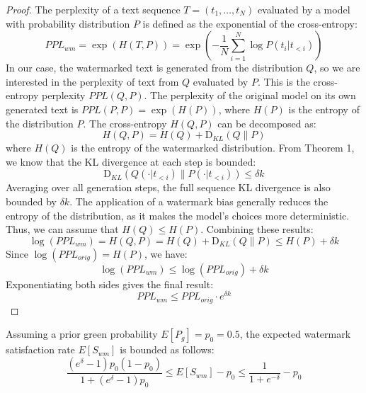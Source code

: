 \begin{proof}
The perplexity of a text sequence $T=(t_1, \dots, t_N)$ evaluated by a model with probability distribution $P$ is defined as the exponential of the cross-entropy:
$$PPL_{wm} = \exp\left(H(T, P)\right) = \exp\left(-\frac{1}{N}\sum_{i=1}^N \log P(t_i|t_{<i})\right)$$
In our case, the watermarked text is generated from the distribution $Q$, so we are interested in the perplexity of text from $Q$ evaluated by $P$. This is the cross-entropy perplexity $PPL(Q,P)$. The perplexity of the original model on its own generated text is $PPL(P,P) = \exp(H(P))$, where $H(P)$ is the entropy of the distribution $P$.
The cross-entropy $H(Q,P)$ can be decomposed as:
$$H(Q,P) = H(Q) + \mathrm{D}_{KL}(Q \parallel P)$$
where $H(Q)$ is the entropy of the watermarked distribution.
From Theorem 1, we know that the KL divergence at each step is bounded:
$$\mathrm{D}_{KL}(Q(\cdot|t_{<i}) \parallel P(\cdot|t_{<i})) \le \delta k$$
Averaging over all generation steps, the full sequence KL divergence is also bounded by $\delta k$.
The application of a watermark bias generally reduces the entropy of the distribution, as it makes the model's choices more deterministic. Thus, we can assume that $H(Q) \le H(P)$.
Combining these results:
$$\log(PPL_{wm}) = H(Q,P) = H(Q) + \mathrm{D}_{KL}(Q \parallel P) \le H(P) + \delta k$$
Since $\log(PPL_{orig}) = H(P)$, we have:
$$\log(PPL_{wm}) \le \log(PPL_{orig}) + \delta k$$
Exponentiating both sides gives the final result:
$$PPL_{wm} \le PPL_{orig} \cdot e^{\delta k}$$
\end{proof}

\begin{theorem}
Assuming a prior green probability $E[P_g] = p_0 = 0.5$, the expected watermark satisfaction rate $E[S_{wm}]$ is bounded as follows:
$$\frac{(e^\delta - 1)p_0(1 - p_0)}{1 + (e^\delta - 1)p_0} \le E[S_{wm}] - p_0 \le \frac{1}{1 + e^{-\delta}} - p_0$$
\end{theorem}

